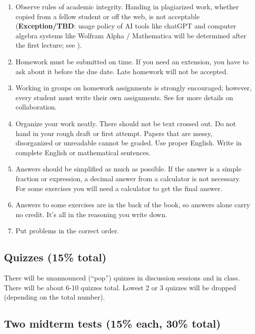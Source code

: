 \documentclass[oneside,11pt]{amsart}
\theoremstyle{definition}
\begin{document}
\begin{enumerate}[$\bullet$]
	\item Observe rules of academic integrity.
		Handing in plagiarized work, whether copied from a fellow student or off the web, is not acceptable (\textbf{Exception/TBD}: usage policy of AI tools like chatGPT and computer algebra systems like Wolfram Alpha / Mathematica will be determined after the first lecture; see ).
    
	\item Homework must be submitted on time. If you need an extension, you have to ask about it before the due date. Late homework will not be accepted.
    
    \item Working in groups on homework assignments is strongly encouraged; however, every student must write their own assignments. See  for more details on collaboration.
    
    \item Organize your work neatly. 
There should not be text crossed out.
Do not hand in your rough draft or first attempt.
Papers that are messy, disorganized or unreadable cannot be graded. Use proper English. Write in complete English or mathematical sentences.
    \item Answers should be simplified as much as possible. If the answer is a simple fraction or expression, a decimal answer from a calculator is not necessary. For some exercises you will need a calculator to get the final answer.
    
    \item Answers to some exercises are in the back of the book, so answers alone carry no credit. It's all in the reasoning you write down.
    
    \item Put problems in the correct order.
\end{enumerate}

\subsection{Quizzes (15\% total)}
 There will be unannounced (``pop'') quizzes in discussion sessions and in class. There will be about 6-10 quizzes total. Lowest 2 or 3 quizzes will be dropped (depending on the total number).


\subsection{Two midterm tests (15\% each, 30\% total)}
\end{document}
